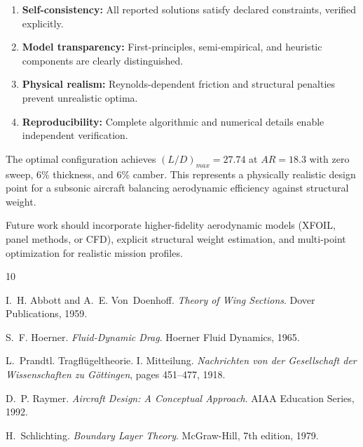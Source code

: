 \documentclass[11pt,a4paper]{article}
\begin{document}
\begin{enumerate}
    \item \textbf{Self-consistency:} All reported solutions satisfy declared constraints, verified explicitly.
    
    \item \textbf{Model transparency:} First-principles, semi-empirical, and heuristic components are clearly distinguished.
    
    \item \textbf{Physical realism:} Reynolds-dependent friction and structural penalties prevent unrealistic optima.
    
    \item \textbf{Reproducibility:} Complete algorithmic and numerical details enable independent verification.
\end{enumerate}

The optimal configuration achieves $(L/D)_{max} = 27.74$ at $AR = 18.3$ with zero sweep, 6\% thickness, and 6\% camber. This represents a physically realistic design point for a subsonic aircraft balancing aerodynamic efficiency against structural weight.

Future work should incorporate higher-fidelity aerodynamic models (XFOIL, panel methods, or CFD), explicit structural weight estimation, and multi-point optimization for realistic mission profiles.



\begin{thebibliography}{10}

I.~H. Abbott and A.~E. Von~Doenhoff.
\newblock \emph{Theory of Wing Sections}.
\newblock Dover Publications, 1959.

S.~F. Hoerner.
\newblock \emph{Fluid-Dynamic Drag}.
\newblock Hoerner Fluid Dynamics, 1965.

L.~Prandtl.
\newblock Tragfl{\"u}geltheorie. {I}. {M}itteilung.
\newblock \emph{Nachrichten von der Gesellschaft der Wissenschaften zu G{\"o}ttingen}, pages 451--477, 1918.

D.~P. Raymer.
\newblock \emph{Aircraft Design: A Conceptual Approach}.
\newblock AIAA Education Series, 1992.

H.~Schlichting.
\newblock \emph{Boundary Layer Theory}.
\newblock McGraw-Hill, 7th edition, 1979.

\end{thebibliography}
\end{document}
